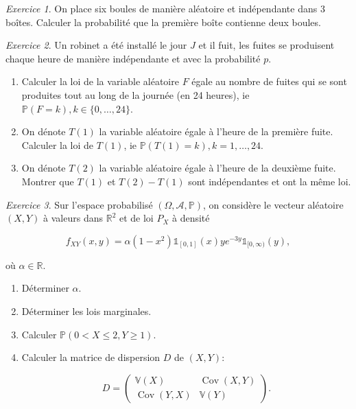\documentclass[french]{book}
\theoremstyle{definition}
\theoremstyle{remark}
\newtheorem{exo}{Exercice}
\newcommand{\lesss}{<}
\newcommand{\less}{\lesss}
\begin{document}
\begin{exo}
  On place six boules de manière aléatoire et indépendante dans 3 boîtes. Calculer la probabilité que la première boîte contienne deux boules.
\end{exo}

\begin{exo}
  Un robinet a été installé le jour \(J\) et il fuit, les fuites se produisent chaque heure de manière indépendante et avec la probabilité \(p\).

  \begin{enumerate}
    \item Calculer la loi de la variable aléatoire \(F\) égale au nombre de fuites qui se sont produites tout au long de la journée (en 24 heures), ie \(\mathbb{P}(F=k), k \in \{ 0, \dots, 24 \}\).
    \item On dénote \(T(1)\) la variable aléatoire égale à l'heure de la première fuite. Calculer la loi de \(T(1)\), ie \(\mathbb{P}(T(1) = k), k=1, \dots, 24\).
    \item On dénote \(T(2)\) la variable aléatoire égale à l'heure de la deuxième fuite. Montrer que \(T(1)\) et \(T(2)-T(1)\) sont indépendantes et ont la même loi.
  \end{enumerate}
\end{exo}

\begin{exo}
  Sur l'espace probabilisé \((\Omega, \mathscr{A}, \mathbb{P})\), on considère le vecteur aléatoire \((X, Y)\) à valeurs dans \(\mathbb{R}^2\) et de loi \(P_X\) à densité

  \[f _{XY}(x,y) = \alpha(1-x ^2) \mathds{1}_{[0, 1]}(x)y e^{-3y} \mathds{1}_{[0, \infty)}(y), \]

  où \(\alpha \in \mathbb{R}\).

  \begin{enumerate}
    \item Déterminer \(\alpha\).
    \item Déterminer les lois marginales.
    \item Calculer \(\mathbb{P}(0 \less X \leq 2, Y \geq 1)\).
    \item Calculer la matrice de dispersion \(D\) de \((X,Y)\):

    \[D= \left(\begin{matrix}
      \mathbb{V}(X) & \operatorname{Cov}(X,Y) \\
      \operatorname{Cov}(Y,X) & \mathbb{V}(Y)
    \end{matrix}\right).\]
  \end{enumerate}


\end{exo}
\end{document}
